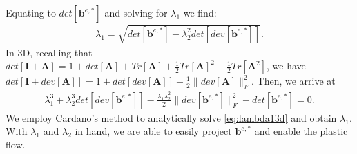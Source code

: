 Equating to $det[\bm{b}^{e,*}]$ and solving for $\lambda_1$ we find:
\begin{align}
  \lambda_1 = \sqrt{det[\bm{b}^{e,*}] - \lambda_2^2 det[ dev[\bm{b}^{e,*}]]}.
\end{align}
In 3D, recalling that $det[\bm{I} + \bm{A}] = 1 + det[\bm{A}] + Tr[\bm{A}] + \frac{1}{2}Tr[\bm{A}]^2 - \frac{1}{2}Tr[\bm{A}^2]$, we have $det[\bm{I} + dev[\bm{A}]] = 1 + det[dev[\bm{A}]]-\frac{1}{2}\|dev[\bm{A}] \|^2_F$. Then, we arrive at
\begin{align}
  \label{eq:lambda13d}
  \lambda^3_1 + \lambda^3_2 det[dev[\bm{b}^{e,*}]] - \frac{\lambda_1 \lambda^2_2}{2} \|dev[\bm{b}^{e,*}]\|^2_F - det[\bm{b}^{e,*}] = 0.
\end{align}
We employ Cardano's method to analytically solve \eqref{eq:lambda13d} and obtain $\lambda_1$.
With $\lambda_1$ and $\lambda_2$ in hand, we are able to easily project $\bm{b}^{e,*}$ and enable the plastic flow.

